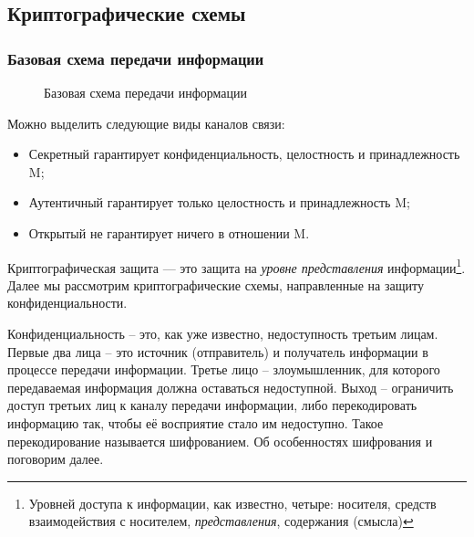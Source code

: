 \subsection{Криптографические схемы}


\begin{frame}
    \frametitle{Базовая схема передачи информации}
    \begin{figure}
        \begin{center}
        \end{center}
        \caption{Базовая схема передачи информации}\label{pict:basechannel}
    \end{figure} 

    Можно выделить следующие виды \alert{каналов связи}:
    \begin{itemize}
        \item \alert{Секретный} гарантирует конфиденциальность, целостность и принадлежность M;
        \item \alert{Аутентичный} гарантирует только целостность и принадлежность M;
        \item \alert{Открытый} не гарантирует ничего в отношении M.
    \end{itemize}
\end{frame}


Криптографическая защита --- это защита на \emph{уровне представления} информации\footnote{Уровней доступа к информации, как известно, четыре: носителя, средств взаимодействия с носителем, \emph{представления}, содержания (смысла)}. Далее мы рассмотрим криптографические схемы, направленные на защиту конфиденциальности.

Конфиденциальность – это, как уже известно, недоступность третьим лицам. Первые два лица – это источник (отправитель) и получатель информации в процессе передачи информации. Третье лицо – злоумышленник, для которого передаваемая информация должна оставаться недоступной. Выход – ограничить доступ третьих лиц к каналу передачи информации, либо перекодировать информацию так, чтобы её восприятие стало им недоступно. Такое перекодирование называется шифрованием. Об особенностях шифрования и поговорим далее.

